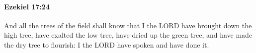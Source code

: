 
		\paragraph{Ezekiel 17:24} %
			\label{EZEKIEL-17-24}

			And all the trees of the field shall know that I the LORD have brought down the high tree, have exalted the low tree, have dried up the green tree, and have made the dry tree to flourish: I the LORD have spoken and have done it.

